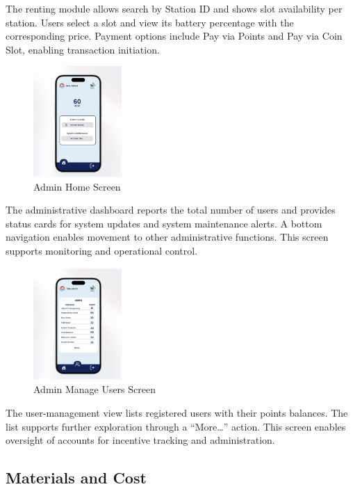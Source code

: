 {  The renting module allows search by Station ID and shows slot availability per station. Users select a slot and view its battery percentage with the corresponding price. Payment options include Pay via Points and Pay via Coin Slot, enabling transaction initiation.
  
  \begin{figure}[H]
  	\centering
  	\caption{Admin Home  Screen}
  	\label{fig:admin}
  	\includegraphics[width=0.3\textwidth]{figures/admin.png}
  \end{figure}
  
  The administrative dashboard reports the total number of users and provides status cards for system updates and system maintenance alerts. A bottom navigation enables movement to other administrative functions. This screen supports monitoring and operational control.
  
      \begin{figure}[H]
      	\centering
      	\caption{Admin Manage Users Screen}
      	\label{fig:admin2}
      	\includegraphics[width=0.3\textwidth]{figures/admin2.png}
      \end{figure}
      
      The user-management view lists registered users with their points balances. The list supports further exploration through a “More…” action. This screen enables oversight of accounts for incentive tracking and administration.
      
      
 \subsection{Materials and Cost}
     
}
